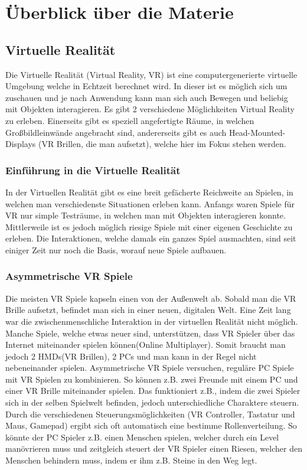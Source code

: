 \chapter{Überblick über die Materie}
\section{Virtuelle Realität}
Die Virtuelle Realität (Virtual Reality, VR) ist eine computergenerierte virtuelle Umgebung welche in Echtzeit berechnet wird. In dieser ist es möglich sich um zuschauen und je nach Anwendung kann man sich auch Bewegen und beliebig mit Objekten interagieren. Es gibt 2 verschiedene Möglichkeiten Virtual Reality zu erleben. Einerseits gibt es speziell angefertigte Räume, in welchen Großbildleinwände angebracht sind, andererseits gibt es auch Head-Mounted-Displays (VR Brillen,  die man aufsetzt), welche hier im Fokus stehen werden.


\subsection{Einführung in die Virtuelle Realität}
In der Virtuellen Realität gibt es eine breit gefächerte Reichweite an Spielen, in welchen man verschiedenste Situationen erleben kann. Anfangs waren Spiele für VR nur simple Testräume, in welchen man mit Objekten interagieren konnte. Mittlerweile ist es jedoch möglich riesige Spiele mit einer eigenen Geschichte zu erleben. Die Interaktionen, welche damals ein ganzes Spiel ausmachten, sind seit einiger Zeit nur noch die Basis, worauf neue Spiele aufbauen.

\subsection{Asymmetrische VR Spiele}
Die meisten VR Spiele kapseln einen von der Außenwelt ab. Sobald man die VR Brille aufsetzt, befindet man sich in einer neuen, digitalen Welt. Eine Zeit lang war die zwischenmenschliche Interaktion in der virtuellen Realität nicht möglich. Manche Spiele, welche etwas neuer sind, unterstützen, dass VR Spieler über das Internet miteinander spielen können(Online Multiplayer). Somit braucht man jedoch 2 HMDs(VR Brillen), 2 PCs und man kann in der Regel nicht nebeneinander spielen. Asymmetrische VR Spiele versuchen, reguläre PC Spiele mit VR Spielen zu kombinieren. So können z.B. zwei Freunde mit einem PC und einer VR Brille miteinander spielen. Das funktioniert z.B., indem die zwei Spieler sich in der selben Spielwelt befinden, jedoch unterschiedliche Charaktere steuern. Durch die verschiedenen Steuerungsmöglichkeiten (VR Controller, Tastatur und Maus, Gamepad) ergibt sich oft automatisch eine bestimme Rollenverteilung. So könnte der PC Spieler z.B. einen Menschen spielen, welcher durch ein Level manövrieren muss und zeitgleich steuert der VR Spieler einen Riesen, welcher den Menschen behindern muss, indem er ihm z.B. Steine in den Weg legt.  

